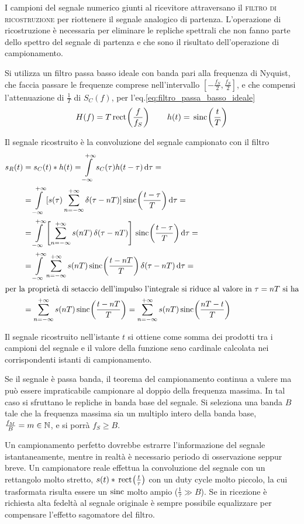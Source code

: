 I campioni del segnale numerico giunti al ricevitore attraversano il \textsc{filtro di ricostruzione} per riottenere il segnale analogico di partenza. L'operazione di ricostruzione è necessaria per eliminare le repliche spettrali che non fanno parte dello spettro del segnale di partenza e che sono il risultato dell'operazione di campionamento.

Si utilizza un filtro passa basso ideale con banda pari alla frequenza di Nyquist, che faccia passare le frequenze comprese nell'intervallo $[-\frac{f_S}{2},\frac{f_S}{2}]$, e che compensi l'attenuazione di $\frac{1}{T}$ di $S_C(f)$, per l'eq.\ref{eq:filtro_passa_basso_ideale}
\begin{equation}
H(f)=T \,{\operatorname{rect}}^{}\!\left({\frac{f}{f_S}}\right)\qquad h(t)=\,{\operatorname{sinc}}^{}\!\left({\frac{t}{T}}\right)
\end{equation}

Il segnale ricostruito è la convoluzione del segnale campionato con il filtro
\begin{equation}\begin{split}
s_R(t)&=s_C(t)\ast h(t)=\intinf{s_C(\tau)h(t-\tau)}{\tau}=\\
&=\intinf{[s(\tau)\sum_{n=-\infty}^{+\infty}\impulse(\tau-n T)]\sinc{\frac{t-\tau}{T}}}{\tau}=\\
&=\intinf{\left[\sum_{n=-\infty}^{+\infty}s(n T)\impulse(\tau-n T)\right]\sinc{\frac{t-\tau}{T}}}{\tau}=\\
&=\intinf{\sum_{n=-\infty}^{+\infty}s(n T)\sinc{\frac{t-n T}{T}}\impulse(\tau-n T)}{\tau}=\\
\intertext{per la proprietà di setaccio dell'impulso l'integrale si riduce al valore in $\tau=n T$ si ha}
&=\sum_{n=-\infty}^{+\infty}s(n T)\sinc{\frac{t-n T}{T}}=\sum_{n=-\infty}^{+\infty}s(n T)\sinc{\frac{n T-t}{T}}
\end{split}
\end{equation}

Il segnale ricostruito nell'istante $t$ si ottiene come somma dei prodotti tra i campioni del segnale e il valore della funzione seno cardinale calcolata nei corrispondenti istanti di campionamento.

\begin{nota}
Se il segnale è passa banda, il teorema del campionamento continua a valere ma può essere impraticabile campionare al doppio della frequenza massima. In tal caso si sfruttano le repliche in banda base del segnale. Si seleziona una banda $B$ tale che la frequenza massima sia un multiplo intero della banda base, $\frac{f_M}{B}=m\in\mathbb{N}$, e si porrà $f_S\geq B$.
\end{nota}
\begin{nota}
Un campionamento perfetto dovrebbe estrarre l'informazione del segnale istantaneamente, mentre in realtà è necessario periodo di osservazione seppur breve. Un campionatore reale effettua la convoluzione del segnale con un rettangolo molto stretto, $s(t)\ast\,{\operatorname{rect}}^{}\!\left({\frac{t}{\tau}}\right)$ con un duty cycle molto piccolo, la cui trasformata risulta essere un $\operatorname{sinc}$ molto ampio ($\frac{1}{\tau}\gg B$). Se in ricezione è richiesta alta fedeltà al segnale originale è sempre possibile equalizzare per compensare l'effetto sagomatore del filtro.
\end{nota}


